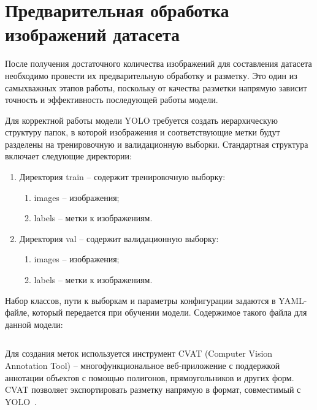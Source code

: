 \chapter{Предварительная обработка изображений датасета}

После получения достаточного количества изображений для составления датасета необходимо провести их предварительную обработку и разметку. Это один из самыхважных этапов работы, поскольку от качества разметки напрямую зависит точность и эффективность последующей работы модели.

Для корректной работы модели YOLO требуется создать иерархическую структуру папок, в которой изображения и соответствующие метки будут разделены на тренировочную и валидационную выборки. Стандартная структура включает следующие директории:

\begin{enumerate}
    \item Директория train -- содержит тренировочную выборку:
    \begin{enumerate}
        \item images -- изображения;
        \item labels -- метки к изображениям.
    \end{enumerate}
    \item Директория val -- содержит валидационную выборку:
    \begin{enumerate}
        \item images -- изображения;
        \item labels -- метки к изображениям.
    \end{enumerate}
\end{enumerate}

Набор классов, пути к выборкам и параметры конфигурации задаются в YAML-файле, который передается при обучении модели. Содержимое такого файла для данной модели:

\begin{code}
\vspace{-0.5cm}
{\small
\inputminted[mathescape,linenos,frame=lines,breaklines]{yaml}{code/train_captcha.yaml}
}
\end{code}
\vspace{-0.4cm}

Для создания меток используется инструмент CVAT (Computer Vision Annotation Tool) -- многофункциональное веб-приложение с поддержкой аннотации объектов с помощью полигонов, прямоугольников и других форм. CVAT позволяет экспортировать разметку напрямую в формат, совместимый с YOLO~\cite{CVAT}.

